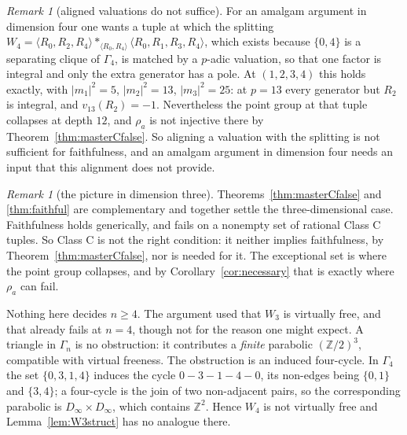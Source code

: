 \documentclass[11pt]{article}
\theoremstyle{definition}
\theoremstyle{remark}
\newtheorem{remark}[theorem]{Remark}
\theoremstyle{definition}
\newcommand{\Z}{\mathbb{Z}}
\begin{document}
\begin{remark}[aligned valuations do not suffice]\label{rem:alignnogo}
For an amalgam argument in dimension four one wants a tuple at which the splitting
$W_4=\langle R_0,R_2,R_4\rangle\ast_{\langle R_0,R_4\rangle}\langle R_0,R_1,R_3,R_4\rangle$,
which exists because $\{0,4\}$ is a separating clique of $\Gamma_4$, is matched by a $p$-adic
valuation, so that one factor is integral and only the extra generator has a pole. At $(1,2,3,4)$
this holds exactly, with $|m_1|^2=5$, $|m_2|^2=13$, $|m_3|^2=25$: at $p=13$ every generator but
$R_2$ is integral, and $v_{13}(R_2)=-1$. Nevertheless the point group at that tuple collapses at
depth $12$, and $\rho_a$ is not injective there by Theorem~\ref{thm:masterCfalse}. So aligning a
valuation with the splitting is not sufficient for faithfulness, and an amalgam argument in
dimension four needs an input that this alignment does not provide.
\end{remark}

\begin{remark}[the picture in dimension three]\label{rem:n3picture}
Theorems~\ref{thm:masterCfalse} and \ref{thm:faithful} are complementary and together settle the
three-dimensional case. Faithfulness holds generically, and fails on a nonempty set of rational
Class C tuples. So Class C is not the right condition: it neither implies faithfulness, by
Theorem~\ref{thm:masterCfalse}, nor is needed for it. The exceptional set is where the point
group collapses, and by Corollary~\ref{cor:necessary} that is exactly where $\rho_a$ can fail.

Nothing here decides $n\ge4$. The argument used that $W_3$ is virtually free, and that already
fails at $n=4$, though not for the reason one might expect. A triangle in $\Gamma_n$ is no
obstruction: it contributes a \emph{finite} parabolic $(\Z/2)^3$, compatible with virtual
freeness. The obstruction is an induced four-cycle. In $\Gamma_4$ the set $\{0,3,1,4\}$ induces
the cycle $0-3-1-4-0$, its non-edges being $\{0,1\}$ and $\{3,4\}$; a four-cycle is the join of
two non-adjacent pairs, so the corresponding parabolic is $D_\infty\times D_\infty$, which
contains $\Z^2$. Hence $W_4$ is not virtually free and Lemma~\ref{lem:W3struct} has no analogue
there.
\end{remark}
\end{document}
